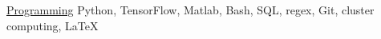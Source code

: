 

\begin{cvskills}

  \cvskill
    {\href{https://github.com/z2e2}{Programming}} %
    {Python, TensorFlow, Matlab, Bash, SQL, regex, Git, cluster computing, \LaTeX} %

\end{cvskills}
